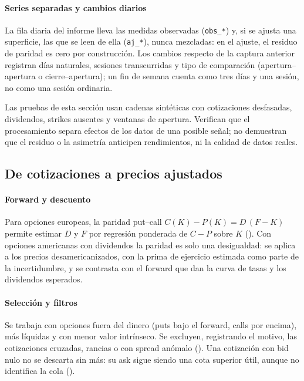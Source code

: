 \paragraph{Series separadas y cambios diarios} La fila diaria del informe lleva las medidas observadas
(\texttt{obs\_*}) y, si se ajusta una superficie, las que se leen de ella (\texttt{aj\_*}), nunca
mezcladas: en el ajuste, el residuo de paridad es cero por construcción. Los cambios respecto de la
captura anterior registran días naturales, sesiones transcurridas y tipo de comparación
(apertura--apertura o cierre--apertura); un fin de semana cuenta como tres días y una sesión, no como una
sesión ordinaria.

\begin{noconcluir}
Las pruebas de esta sección usan cadenas sintéticas con cotizaciones desfasadas, dividendos, strikes
ausentes y ventanas de apertura. Verifican que el procesamiento separa efectos de los datos de una posible
señal; no demuestran que el residuo o la asimetría anticipen rendimientos, ni la calidad de datos reales.
\end{noconcluir}

\subsection{De cotizaciones a precios ajustados}\label{sec:ajuste_precios}

\paragraph{Forward y descuento} Para opciones europeas, la paridad put--call
$C(K)-P(K)=D\,(F-K)$ permite estimar $D$ y $F$ por regresión ponderada de $C-P$ sobre $K$
(). Con opciones americanas con dividendos la paridad es solo una desigualdad: se
aplica a los precios desamericanizados, con la prima de ejercicio estimada como parte de la
incertidumbre, y se contrasta con el forward que dan la curva de tasas y los dividendos esperados.

\paragraph{Selección y filtros} Se trabaja con opciones fuera del dinero (puts bajo el forward, calls por
encima), más líquidas y con menor valor intrínseco. Se excluyen, registrando el motivo, las cotizaciones
cruzadas, rancias o con spread anómalo (). Una cotización con bid nulo no se descarta sin más: su ask sigue
siendo una cota superior útil, aunque no identifica la cola ().

